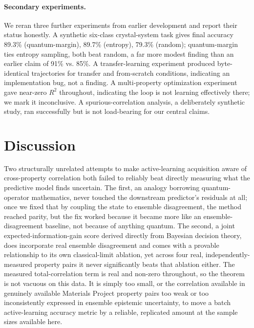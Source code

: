 \documentclass[10pt]{article}
\begin{document}
\paragraph{Secondary experiments.} We reran three further experiments from earlier development and report their status honestly. A synthetic six-class crystal-system task gives final accuracy 89.3\% (quantum-margin), 89.7\% (entropy), 79.3\% (random); quantum-margin ties entropy sampling, both beat random, a far more modest finding than an earlier claim of 91\% vs. 85\%. A transfer-learning experiment produced byte-identical trajectories for transfer and from-scratch conditions, indicating an implementation bug, not a finding. A multi-property optimization experiment gave near-zero $R^2$ throughout, indicating the loop is not learning effectively there; we mark it inconclusive. A spurious-correlation analysis, a deliberately synthetic study, ran successfully but is not load-bearing for our central claims.

\section{Discussion}

Two structurally unrelated attempts to make active-learning acquisition aware of cross-property correlation both failed to reliably beat directly measuring what the predictive model finds uncertain. The first, an analogy borrowing quantum-operator mathematics, never touched the downstream predictor's residuals at all; once we fixed that by coupling the state to ensemble disagreement, the method reached parity, but the fix worked because it became more like an ensemble-disagreement baseline, not because of anything quantum. The second, a joint expected-information-gain score derived directly from Bayesian decision theory, does incorporate real ensemble disagreement and comes with a provable relationship to its own classical-limit ablation, yet across four real, independently-measured property pairs it never significantly beats that ablation either. The measured total-correlation term is real and non-zero throughout, so the theorem is not vacuous on this data. It is simply too small, or the correlation available in genuinely available Materials Project property pairs too weak or too inconsistently expressed in ensemble epistemic uncertainty, to move a batch active-learning accuracy metric by a reliable, replicated amount at the sample sizes available here.
\end{document}

